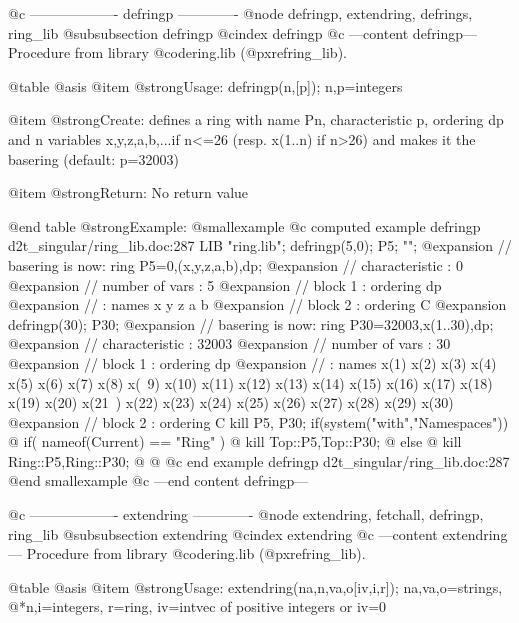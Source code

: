 @c ------------------- defringp -------------
@node defringp, extendring, defrings, ring_lib
@subsubsection defringp
@cindex defringp
@c ---content defringp---
Procedure from library @code{ring.lib} (@pxref{ring_lib}).

@table @asis
@item @strong{Usage:}
defringp(n,[p]); n,p=integers

@item @strong{Create:}
defines a ring with name Pn, characteristic p, ordering dp and n
variables x,y,z,a,b,...if n<=26 (resp. x(1..n) if n>26) and makes it
the basering (default: p=32003)

@item @strong{Return:}
No return value

@end table
@strong{Example:}
@smallexample
@c computed example defringp d2t_singular/ring_lib.doc:287 
LIB "ring.lib";
defringp(5,0); P5; "";
@expansion{} // basering is now: ring P5=0,(x,y,z,a,b),dp;
@expansion{} //   characteristic : 0
@expansion{} //   number of vars : 5
@expansion{} //        block   1 : ordering dp
@expansion{} //                  : names    x y z a b 
@expansion{} //        block   2 : ordering C
@expansion{} 
defringp(30); P30;
@expansion{} // basering is now: ring P30=32003,x(1..30),dp;
@expansion{} //   characteristic : 32003
@expansion{} //   number of vars : 30
@expansion{} //        block   1 : ordering dp
@expansion{} //                  : names    x(1) x(2) x(3) x(4) x(5) x(6) x(7) x(8) x(\
   9) x(10) x(11) x(12) x(13) x(14) x(15) x(16) x(17) x(18) x(19) x(20) x(21\
   ) x(22) x(23) x(24) x(25) x(26) x(27) x(28) x(29) x(30) 
@expansion{} //        block   2 : ordering C
kill P5, P30;
if(system("with","Namespaces")) @{
if( nameof(Current) == "Ring" ) @{
kill Top::P5,Top::P30;
@} else @{
kill Ring::P5,Ring::P30;
@}
@}
@c end example defringp d2t_singular/ring_lib.doc:287
@end smallexample
@c ---end content defringp---

@c ------------------- extendring -------------
@node extendring, fetchall, defringp, ring_lib
@subsubsection extendring
@cindex extendring
@c ---content extendring---
Procedure from library @code{ring.lib} (@pxref{ring_lib}).

@table @asis
@item @strong{Usage:}
extendring(na,n,va,o[iv,i,r]); na,va,o=strings,
@*n,i=integers, r=ring, iv=intvec of positive integers or iv=0

